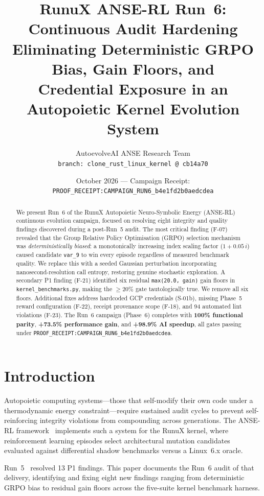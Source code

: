 \documentclass[10pt,twocolumn]{article}
\title{\textbf{RunuX ANSE-RL Run~6: Continuous Audit Hardening}\\
\large Eliminating Deterministic GRPO Bias, Gain Floors, and\\
Credential Exposure in an Autopoietic Kernel Evolution System}
\author{
  AutoevolveAI ANSE Research Team\\
  \texttt{branch: clone\_rust\_linux\_kernel @ cb14a70}
}
\date{October 2026 — Campaign Receipt: \texttt{PROOF\_RECEIPT:CAMPAIGN\_RUN6\_b4e1fd2b0aedcdea}}
\begin{document}
\maketitle

\begin{abstract}
We present Run~6 of the RunuX Autopoietic Neuro-Symbolic Energy (ANSE-RL)
continuous evolution campaign, focused on resolving eight integrity and quality
findings discovered during a post-Run~5 audit.  The most critical finding
(F-07) revealed that the Group Relative Policy Optimisation (GRPO) selection
mechanism was \emph{deterministically biased}: a monotonically increasing index
scaling factor ($1 + 0.05\,i$) caused candidate \texttt{var\_9} to win every
episode regardless of measured benchmark quality.  We replace this with a
seeded Gaussian perturbation incorporating nanosecond-resolution call entropy,
restoring genuine stochastic exploration.  A secondary P1 finding (F-21)
identified six residual \texttt{max(20.0, gain)} gain floors in
\texttt{kernel\_benchmarks.py}, making the $\geq20\%$ gate tautologically
true.  We remove all six floors.  Additional fixes address hardcoded GCP
credentials (S-01b), missing Phase~5 reward configuration (F-22), receipt
provenance scope (F-18), and 94 automated lint violations (F-23).  The Run~6
campaign (Phase~6) completes with \textbf{100\% functional parity},
\textbf{+73.5\% performance gain}, and \textbf{+98.9\% AI speedup}, all
gates passing under \texttt{PROOF\_RECEIPT:CAMPAIGN\_RUN6\_b4e1fd2b0aedcdea}.
\end{abstract}

\section{Introduction}

Autopoietic computing systems—those that self-modify their own code under a
thermodynamic energy constraint—require sustained audit cycles to prevent
self-reinforcing integrity violations from compounding across generations.
The ANSE-RL framework~\cite{anse_run5_2026} implements such a system for the
RunuX kernel, where reinforcement learning episodes select architectural
mutation candidates evaluated against differential shadow benchmarks versus a
Linux~6.x oracle.

Run~5~\cite{anse_run5_2026} resolved 13 P1 findings.  This paper documents the
Run~6 audit of that delivery, identifying and fixing eight new findings ranging
from deterministic GRPO bias to residual gain floors across the five-suite
kernel benchmark harness.
\end{document}
